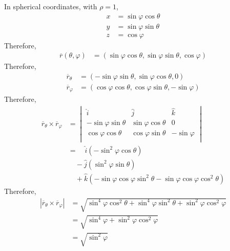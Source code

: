 \documentclass[fleqn, a4paper, 12pt, twoside]{article}
\theoremstyle{definition}
\theoremstyle{theorem}
\begin{document}
{\begin{solution}
	In spherical coordinates, with $\rho = 1$,
	\begin{align*}
		x & = \sin \varphi \cos \theta \\
		y & = \sin \varphi \sin \theta \\
		z & = \cos \varphi
	\end{align*}
	Therefore,
	\begin{align*}
		\overline{r}(\theta , \varphi) & = (\sin \varphi \cos \theta , \sin \varphi \sin \theta , \cos \varphi)
	\end{align*}
	Therefore,
	\begin{align*}
		\overline{r}_{\theta}  & = (-\sin \varphi \sin \theta , \sin \varphi \cos \theta , 0) \\
		\overline{r}_{\varphi} & = (\cos \varphi \cos \theta , \cos \varphi \sin \theta , -\sin \varphi)
	\end{align*}
	Therefore,
	\begin{align*}
		\overline{r}_{\theta} \times \overline{r}_{\varphi} &=
			\begin{vmatrix}
				\hat{i}                   & \hat{j}                  & \hat{k}       \\
				-\sin \varphi \sin \theta & \sin \varphi \cos \theta & 0             \\
				\cos \varphi \cos \theta  & \cos \varphi \sin \theta & -\sin \varphi \\
			\end{vmatrix}\\
		&= \quad \hat{i} \left( -\sin^2 \varphi \cos \theta \right)\\
		&\quad - \hat{j} \left( \sin^2 \varphi \sin \theta \right)\\
		&\quad + \hat{k} \left( -\sin \varphi \cos \varphi \sin^2 \theta - \sin \varphi \cos \varphi \cos^2 \theta \right)
	\end{align*}
	Therefore,
	\begin{align*}
		\left| \overline{r}_{\theta} \times \overline{r}_{\varphi} \right| & = \sqrt{\sin^4 \varphi \cos^2 \theta + \sin^4 \varphi \sin^2 \theta + \sin^2 \varphi \cos^2 \varphi} \\
                                                                                   & = \sqrt{\sin^4 \varphi + \sin^2 \varphi \cos^2 \varphi}                                              \\
                                                                                   & = \sqrt{\sin^2 \varphi}                                                                              \\

\end{align*}
\end{solution}}
\end{document}
